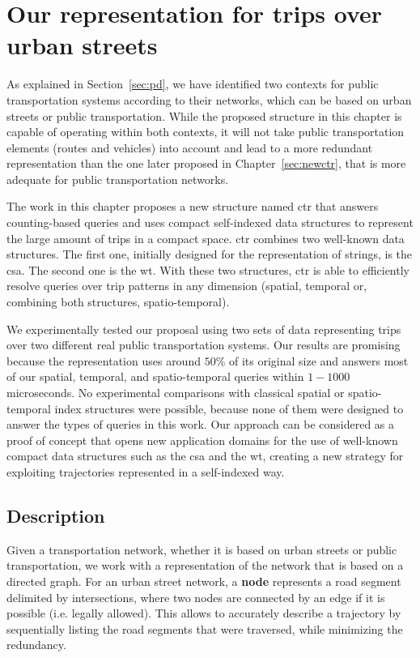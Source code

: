 \chapter{Our representation for trips over urban streets}
\label{sec:ctr}
	As explained in Section~\ref{sec:pd}, we have identified two contexts for public transportation systems according to their networks, which can be based on urban streets or public transportation. While the proposed structure in this chapter is capable of operating within both contexts, it will not take public transportation elements (routes and vehicles) into account and lead to a more redundant representation than the one later proposed in Chapter~\ref{sec:newctr}, that is more adequate for public transportation networks.
	
	The work in this chapter proposes a new structure named \gls{ctr} that answers  counting-based queries and uses compact self-indexed data structures to represent the large amount of trips in a compact space.
	\gls{ctr} combines two well-known data structures. The first one,
	initially designed for the representation of strings, is the
	\gls{csa}. The second
	one is the \gls{wt}. With these two structures, \gls{ctr} is able to efficiently resolve queries over trip patterns in any dimension (spatial, temporal or, combining both structures, spatio-temporal).

	We experimentally tested our proposal using two sets of %
	data representing trips over two different real public
	transportation systems. Our results are promising because the
	representation uses around  $50$\% of its original size and
	answers most of our spatial, temporal,  and spatio-temporal queries within $1\!-\!1000$ microseconds. 
	No experimental comparisons with classical spatial or spatio-temporal
	index structures were possible, because none of them were designed to
	answer the types of queries in this work. Our approach can  be
	considered as a proof of concept that opens new application
	domains for the use of well-known compact data structures such as the
	\gls{csa} and the \gls{wt}, creating a new strategy for
	exploiting trajectories represented in a self-indexed way.

\section{Description}
\label{sec:ctr:desc}
    Given a transportation network, whether it is based on urban streets or public transportation, we work with a representation of the network that is based on a directed graph. For an urban street network, a \textbf{node} represents a road segment delimited by intersections, where two nodes are connected by an edge if it is possible (i.e. legally allowed). This allows to accurately describe a trajectory by sequentially listing the road segments that were traversed, while minimizing the redundancy.

